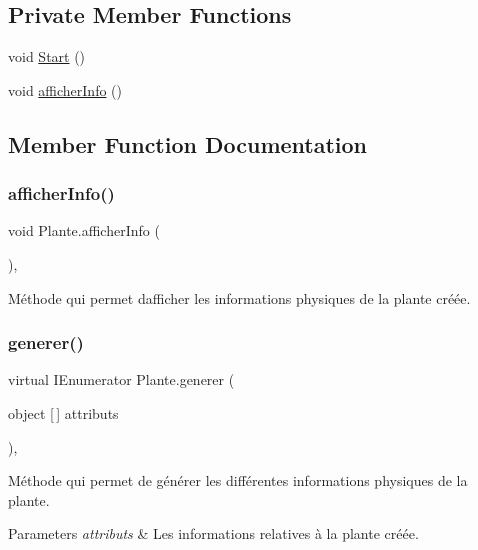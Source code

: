 \subsection*{Private Member Functions}
\begin{DoxyCompactItemize}
\item 
void \mbox{\hyperlink{class_plante_a3122e53122617f91347210bd4011b123}{Start}} ()
\item 
void \mbox{\hyperlink{class_plante_a21869b54aea664f09df57e5681d890ae}{afficher\+Info}} ()
\end{DoxyCompactItemize}


\subsection{Member Function Documentation}
\mbox{\label{class_plante_a21869b54aea664f09df57e5681d890ae}} 
\subsubsection{\texorpdfstring{afficher\+Info()}{afficherInfo()}}
{\footnotesize\ttfamily void Plante.\+afficher\+Info (\begin{DoxyParamCaption}{ }\end{DoxyParamCaption})\hspace{0.3cm}{\ttfamily [inline]}, {\ttfamily [private]}}

Méthode qui permet d\textquotesingle{}afficher les informations physiques de la plante créée. \mbox{\label{class_plante_a57fe2932f99367a29150ac5280fda729}} 
\subsubsection{\texorpdfstring{generer()}{generer()}}
{\footnotesize\ttfamily virtual I\+Enumerator Plante.\+generer (\begin{DoxyParamCaption}\item[{object \mbox{[}$\,$\mbox{]}}]{attributs }\end{DoxyParamCaption})\hspace{0.3cm}{\ttfamily [inline]}, {\ttfamily [virtual]}}

Méthode qui permet de générer les différentes informations physiques de la plante. 
\begin{DoxyParams}{Parameters}
{\em attributs} & Les informations relatives à la plante créée. \\
\hline
\end{DoxyParams}


